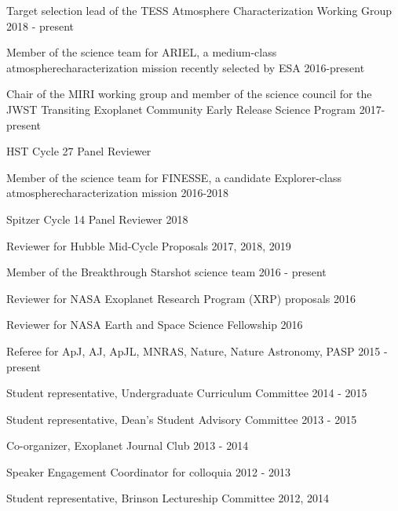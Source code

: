 \documentclass[12pt,letterpaper]{article}
\begin{document}
\begin{compactitem}[]
\item {Target selection lead of the TESS Atmosphere Characterization Working Group \hfill 2018 - present}	
\item {Member of the science team for ARIEL, a medium-class atmosphere\newline characterization mission recently selected by ESA \hfill 2016-present}
\item {Chair of the MIRI working group and member of the science council for the \newline JWST Transiting Exoplanet Community Early Release Science Program \hfill 2017- present}
\item{HST Cycle 27 Panel Reviewer}
\item {Member of the science team for FINESSE, a candidate Explorer-class atmosphere\newline characterization mission \hfill 2016-2018}
\item {Spitzer Cycle 14 Panel Reviewer \hfill 2018}
\item {Reviewer for Hubble Mid-Cycle Proposals \hfill 2017, 2018, 2019}
\item {Member of the Breakthrough Starshot science team \hfill 2016 - present}
\item Reviewer for NASA Exoplanet Research Program (XRP) proposals \hfill	2016
\item Reviewer for NASA Earth and Space Science Fellowship \hfill 2016
\item Referee for ApJ, AJ, ApJL, MNRAS, Nature, Nature Astronomy, PASP \hfill 2015 - present
\item Student representative, Undergraduate Curriculum Committee \hfill 2014 - 2015
\item Student representative, Dean's Student Advisory Committee \hfill 2013 - 2015
\item Co-organizer, Exoplanet Journal Club \hfill 2013 - 2014
\item Speaker Engagement Coordinator for colloquia \hfill 2012 - 2013
\item Student representative, Brinson Lectureship Committee \hfill 2012, 2014
\end{compactitem}
\end{document}
